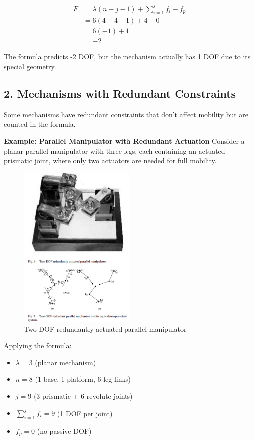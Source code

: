 \begin{solution}
    \begin{align*}
        F &= \lambda(n - j - 1) + \sum_{i=1}^j f_i - f_p \\
          &= 6(4 - 4 - 1) + 4 - 0 \\
          &= 6(-1) + 4 \\
          &= -2
    \end{align*}

    The formula predicts -2 DOF, but the mechanism actually has 1 DOF due to its special geometry.

    \subsection*{2. Mechanisms with Redundant Constraints}
    Some mechanisms have redundant constraints that don't affect mobility but are counted in the formula.

    \textbf{Example: Parallel Manipulator with Redundant Actuation}
    Consider a planar parallel manipulator with three legs, each containing an actuated prismatic joint, where only two actuators are needed for full mobility.
    
    \begin{figure}[H]
        \centering
        \includegraphics[width=0.5\textwidth]{redudant.png}
        \caption{Two-DOF redundantly actuated parallel manipulator \cite{cheng2003dynamics}}
        \label{fig:redundant_parallel}
    \end{figure}

    Applying the formula:
    \begin{itemize}
        \item $\lambda = 3$ (planar mechanism)
        \item $n = 8$ (1 base, 1 platform, 6 leg links)
        \item $j = 9$ (3 prismatic + 6 revolute joints)
        \item $\sum_{i=1}^j f_i = 9$ (1 DOF per joint)
        \item $f_p = 0$ (no passive DOF)
    \end{itemize}


\end{solution}
